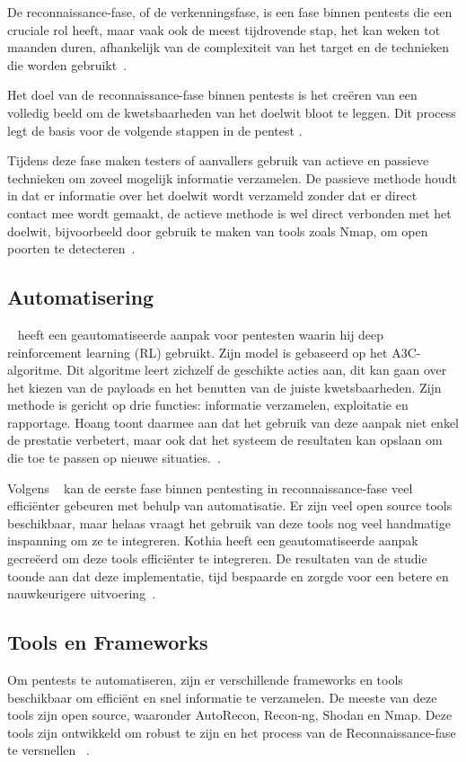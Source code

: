 De reconnaissance-fase, of de verkenningsfase, is een fase binnen pentests die een cruciale rol heeft, maar vaak ook de meest tijdrovende stap, 
het kan weken tot maanden duren, afhankelijk van de complexiteit van het target en de technieken die worden gebruikt~\autocite{Shah}. 

Het doel van de reconnaissance-fase binnen pentests is het creëren van een volledig beeld om de 
kwetsbaarheden van het doelwit bloot te leggen. Dit process legt de basis voor de
volgende stappen in de pentest \autocite{Kothia}.

Tijdens deze fase maken testers of aanvallers gebruik van actieve en passieve technieken om zoveel
mogelijk informatie verzamelen. De passieve methode houdt in dat er informatie over het doelwit wordt verzameld zonder dat er direct contact mee wordt gemaakt, 
de actieve methode is wel direct verbonden met het doelwit, bijvoorbeeld door gebruik te maken van tools zoals Nmap, om open poorten te detecteren~\autocite{Shah}.


\subsection{Automatisering}

~\textcite{Hoang} heeft een geautomatiseerde aanpak voor pentesten waarin hij deep reinforcement 
learning (RL) gebruikt. Zijn model is gebaseerd op het A3C-algoritme. Dit algoritme leert zichzelf de geschikte acties aan, dit kan 
gaan over het kiezen van de payloads en het benutten van de juiste kwetsbaarheden. Zijn methode is gericht op drie functies: informatie verzamelen, 
exploitatie en rapportage. Hoang toont daarmee aan dat het gebruik van deze aanpak niet enkel de prestatie verbetert, maar ook dat het systeem de resultaten 
kan opslaan om die toe te passen op nieuwe situaties.~\autocite{Hoang}.


Volgens ~\textcite{Kothia} kan de eerste fase binnen pentesting in reconnaissance-fase veel 
efficiënter gebeuren met behulp van automatisatie. Er zijn veel open source tools beschikbaar, maar helaas vraagt het gebruik van deze 
tools nog veel handmatige inspanning om ze te integreren. Kothia heeft een geautomatiseerde aanpak gecreëerd om deze tools
efficiënter te integreren. De resultaten van de studie toonde aan dat deze implementatie, tijd 
bespaarde en zorgde voor een betere en nauwkeurigere uitvoering~\autocite{Kothia}.


\newline \subsection{Tools en Frameworks}
\newline Om pentests te automatiseren, zijn er verschillende frameworks en tools beschikbaar om 
efficiënt en snel informatie te verzamelen. De meeste van deze tools zijn open source, waaronder 
AutoRecon, Recon-ng, Shodan en Nmap. Deze tools zijn ontwikkeld om robust te zijn en het process van de Reconnaissance-fase te versnellen ~\autocite{Shebli}.



